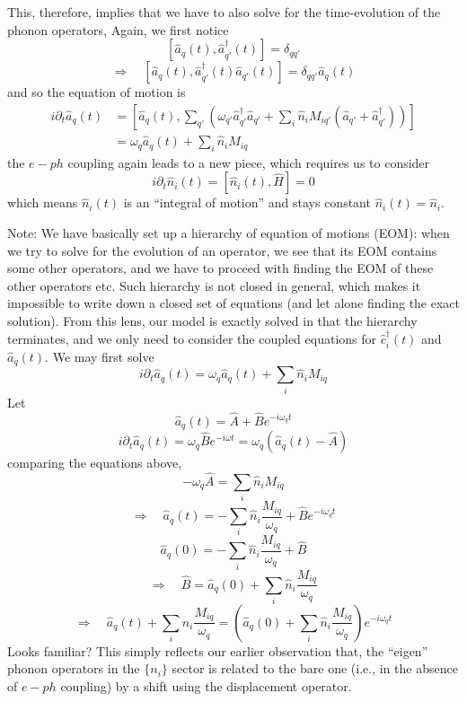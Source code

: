 This, therefore, implies that we have to also solve for the time-evolution of the phonon operators, Again, we first notice
\[ \left[ \hat{a}_q\left( t \right) ,\hat{a}_{q'}^{\dagger}\left( t \right) \right] =\delta _{qq'}\]
\[ \Rightarrow \quad \left[ \hat{a}_q\left( t \right) ,\hat{a}_{q'}^{\dagger}\left( t \right) \hat{a}_{q'}\left( t \right) \right] =\delta _{qq'}\hat{a}_q\left( t \right) \]
and so the equation of motion is
\begin{align*}
    i\partial _t\hat{a}_q\left( t \right) &=\left[ \hat{a}_q\left( t \right) ,\sum_{q'}{\left( \omega _{q'}\hat{a}_{q'}^{\dagger}\hat{a}_{q'}+\sum_i{\hat{n}_iM_{iq'}\left( \hat{a}_{q'}+\hat{a}_{q'}^{\dagger} \right)} \right)} \right] \\
    &=\omega _q\hat{a}_q\left( t \right) +\sum_i{\hat{n}_iM_{iq}}
\end{align*}
the $e-ph$ coupling again leads to a new piece, which requires us to consider
\[ i\partial _t\hat{n}_i\left( t \right) =\left[ \hat{n}_i\left( t \right) ,\hat{H} \right] =0\]
which means $\hat{n}_i(t)$ is an ``integral of motion'' and stays constant $\hat{n}_i(t)=\hat{n}_i$.

Note: We have basically set up a hierarchy of equation of motions (EOM): when we try to solve for the evolution of an operator, we see that its EOM contains some other operators, and we have to proceed with finding the EOM of these other operators etc. Such hierarchy is not closed in general, which makes it impossible to write down a closed set of equations (and let alone finding the exact solution). From this lens, our model is exactly solved in that the hierarchy terminates, and we only need to consider the coupled equations for $\hat{c}_i^\dagger (t)$ and $\hat{a}_q(t)$. We may first solve
\[ i\partial _t\hat{a}_q\left( t \right) =\omega _q\hat{a}_q\left( t \right) +\sum_i{\hat{n}_iM_{iq}}\]
Let
\[ \hat{a}_q\left( t \right) =\hat{A}+\hat{B}e^{-i\omega_qt}\]
\[ i\partial _t\hat{a}_q\left( t \right) =\omega _q\hat{B}e^{-i\omega t}=\omega _q\left( \hat{a}_q\left( t \right) -\hat{A} \right) \]
comparing the equations above,
\[ -\omega _q\hat{A}=\sum_i{\hat{n}_iM_{iq}}\]
\[ \Rightarrow\quad \hat{a}_q\left( t \right) =-\sum_i{\hat{n}_i\frac{M_{iq}}{\omega _q}}+\hat{B}e^{-i\omega _qt}\]
\[ \hat{a}_q\left( 0 \right) =-\sum_i{\hat{n}_i\frac{M_{iq}}{\omega _q}}+\hat{B}\]
\[ \Rightarrow \quad \hat{B}=\hat{a}_q\left( 0 \right) +\sum_i{\hat{n}_i\frac{M_{iq}}{\omega _q}}\]
\[ \Rightarrow \quad \hat{a}_q\left( t \right) +\sum_i{\hat{n}_i\frac{M_{iq}}{\omega _q}}=\left( \hat{a}_q\left( 0 \right) +\sum_i{\hat{n}_i\frac{M_{iq}}{\omega _q}} \right) e^{-i\omega _qt}\]
Looks familiar? This simply reflects our earlier observation that, the ``eigen'' phonon operators in the $\{n_i\}$ sector is related to the bare one (i.e., in the absence of $e-ph$ coupling) by a shift using the displacement operator.

